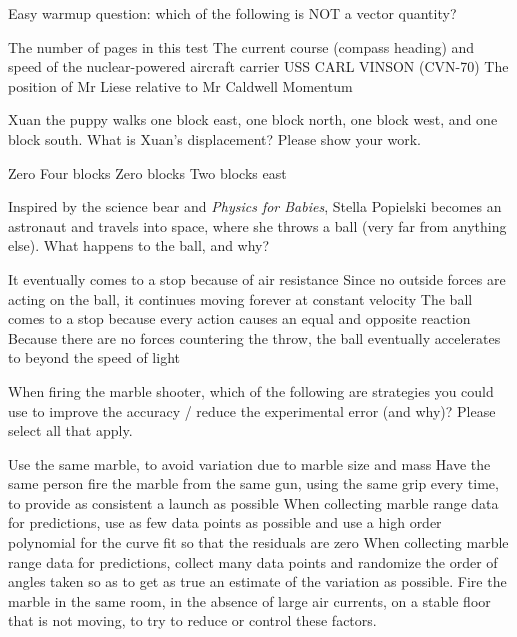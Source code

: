\documentclass[exam,addpoints, answers]{exam}
\begin{document}
\begin{questions}
\question[5] Easy warmup question: which of the following is NOT a vector quantity?
\begin{choices}
\CorrectChoice The number of pages in this test
\choice The current course (compass heading) and speed of the nuclear-powered aircraft carrier USS CARL VINSON (CVN-70)
\choice The position of Mr Liese relative to Mr Caldwell
\choice Momentum
\end{choices}



\question[5] Xuan the puppy walks one block east, one block north, one block west, and one block south. What is Xuan's displacement? Please show your work.
\begin{choices}
\choice Zero
\choice Four blocks
\CorrectChoice Zero blocks
\choice Two blocks east
\end{choices}



\question[5] Inspired by the science bear and \emph{Physics for Babies}, Stella Popielski becomes an astronaut and travels into space, where she throws a ball (very far from anything else). What happens to the ball, and why?
\begin{choices}
\choice It eventually comes to a stop because of air resistance
\CorrectChoice Since no outside forces are acting on the ball, it continues moving forever at constant velocity
\choice The ball comes to a stop because every action causes an equal and opposite reaction
\choice Because there are no forces countering the throw, the ball eventually accelerates to beyond the speed of light
\end{choices}



\question[5]When firing the marble shooter, which of the following are strategies you could use to improve the accuracy / reduce the experimental error (and why)? Please select all that apply. 
\begin{choices}
\CorrectChoice Use the same marble, to avoid variation due to marble size and mass
\CorrectChoice Have the same person fire the marble from the same gun, using the same grip every time, to provide as consistent a launch as possible
\choice When collecting marble range data for predictions, use as few data points as possible and use a high order polynomial for the curve fit so that the residuals are zero
\CorrectChoice When collecting marble range data for predictions, collect many data points and randomize the order of angles taken so as to get as true an estimate of the variation as possible. 
\CorrectChoice Fire the marble in the same room, in the absence of large air currents, on a stable floor that is not moving, to try to reduce or control these factors. 
\end{choices}




\end{questions}
\end{document}
